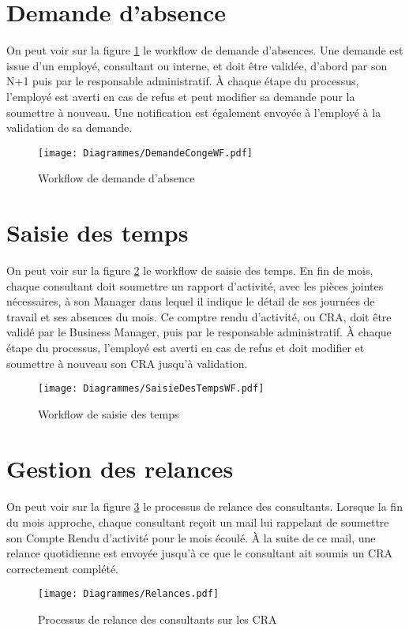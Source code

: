 \section{Demande d'absence}
On peut voir sur la figure \ref{conges} le workflow de demande d'absences. Une demande est issue d'un employé, consultant ou interne, et doit être validée, d'abord par son N+1 puis par le responsable administratif. À chaque étape du processus, l'employé est averti en cas de refus et peut modifier sa demande pour la soumettre à nouveau. Une notification est également envoyée à l'employé à la validation de sa demande.
\begin{figure}
	\centering
	\begin{sideways}
		\texttt{[image: Diagrammes/DemandeCongeWF.pdf]}
	\end{sideways}
	\caption{Workflow de demande d'absence}
	\label{conges}
\end{figure}

\section{Saisie des temps}

On peut voir sur la figure \ref{tps} le workflow de saisie des temps. En fin de mois, chaque consultant doit soumettre un rapport d'activité, avec les pièces jointes nécessaires, à son Manager dans lequel il indique le détail de ses journées de travail et ses absences du mois. Ce comptre rendu d'activité, ou CRA, doit être validé par le Business Manager, puis par le responsable administratif. À chaque étape du processus, l'employé est averti en cas de refus et doit modifier et soumettre à nouveau son CRA jusqu'à validation.
\begin{figure}
	\centering
	\begin{sideways}
		\texttt{[image: Diagrammes/SaisieDesTempsWF.pdf]}
	\end{sideways}
	\caption{Workflow de saisie des temps}
	\label{tps}
\end{figure}


\section{Gestion des relances}
\paragraph{} On peut voir sur la figure \ref{relances} le processus de relance des consultants. Lorsque la fin du mois approche, chaque consultant reçoit un mail lui rappelant de soumettre son Compte Rendu d'activité pour le mois écoulé. À la suite de ce mail, une relance quotidienne est envoyée jusqu'à ce que le consultant ait soumis un CRA correctement complété.
\begin{figure}
\centering
	\texttt{[image: Diagrammes/Relances.pdf]}
	\caption{Processus de relance des consultants sur les CRA}
	\label{relances}
\end{figure}


